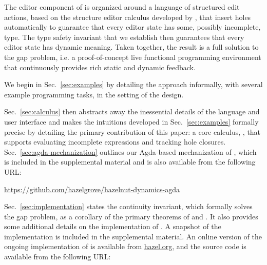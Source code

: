 The editor component of \Hazel is organized around a language of structured edit actions, 
based on the \Hazelnut structure editor calculus developed by \citet{popl-paper}, that insert holes automatically to guarantee that
every editor state has some, possibly incomplete, type. 
The type safety invariant that we establish then guarantees that every editor state has dynamic meaning. Taken together, the result is a full solution to the gap problem, i.e. a proof-of-concept
live functional programming environment that continuously provides rich static and dynamic feedback.

\vspace{-2px}

\newcommand{\contribution}[2]{\paragraph{#1. #2}} 


We begin in Sec.~\ref{sec:examples} by detailing the approach informally, with several example programming tasks, in the setting of the \Hazel design. 

Sec.~\ref{sec:calculus} then abstracts away the inessential details of the language and user interface and makes the  intuitions developed in Sec.~\ref{sec:examples} formally precise by detailing the primary contribution of this paper: a core calculus, \HazelnutLive, that supports evaluating incomplete expressions and tracking hole closures. 
Sec.~\ref{sec:agda-mechanization} outlines our Agda-based mechanization of \HazelnutLive, which is included in the supplemental material and is also available from the following URL: 

\begin{center}
\url{https://github.com/hazelgrove/hazelnut-dynamics-agda}
\end{center}

\noindent
Sec.~\ref{sec:implementation} states the continuity invariant, which formally solves the gap problem, as a corollary of the primary theorems of \Hazelnut and \HazelnutLive. It also provides some additional details on the implementation of \Hazel. A snapshot of the implementation is included in the supplemental material. An online version of the ongoing implementation of \Hazel is available from \url{hazel.org}, and the source code is available from the following URL:

